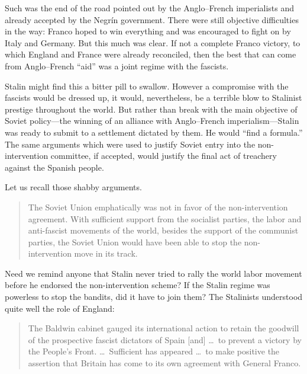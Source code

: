Such was the end of the road pointed out by the Anglo--French imperialists and already accepted by the Negr\'in government. There were still objective difficulties in the way: Franco hoped to win everything and was encouraged to fight on by Italy and Germany. But this much was clear. If not a complete Franco victory, to which England and France were already reconciled, then the best that can come from Anglo--French ``aid'' was a joint regime with the fascists.


Stalin might find this a bitter pill to swallow. However a compromise with the fascists would be dressed up, it would, nevertheless, be a terrible blow to Stalinist prestige throughout the world. But rather than break with the main objective of Soviet policy—the winning of an alliance with Anglo--French imperialism—Stalin was ready to submit to a settlement dictated by them. He would ``find a formula.'' The same arguments which were used to justify Soviet entry into the non-intervention committee, if accepted, would justify the final act of treachery against the Spanish people.

\smallskip

Let us recall those shabby arguments.

\begin{quotation}
  The Soviet Union emphatically was not in favor of the non-intervention agreement. With sufficient support from the socialist parties, the labor and anti-fascist movements of the world, besides the support of the communist parties, the Soviet Union would have been able to stop the non-interven\-tion move in its track.\label{en:GannesUSSR}
\end{quotation}

Need we remind anyone that Stalin never tried to rally the world labor movement before he endorsed the non-intervention scheme? If the Stalin regime was powerless to stop the bandits, did it have to join them? The Stalinists understood quite well the role of England: 

\begin{quotation}
  The Baldwin cabinet gauged its international action to retain the goodwill of the prospective fascist dictators of Spain [and] \dots\ to prevent a victory by the People’s Front. \dots\ Sufficient has appeared \dots\ to make positive the assertion that Britain has come to its own agreement with General Franco.\endnotemark[\ref{en:GannesUSSR}]
\end{quotation}

